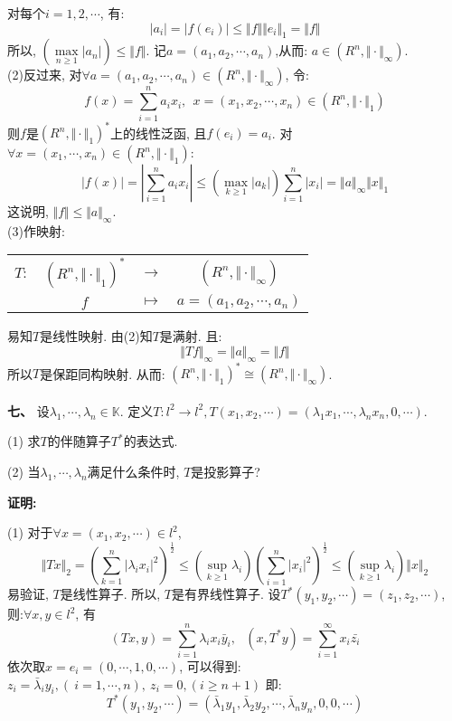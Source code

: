 \documentclass{article}
\begin{document}
对每个$i=1,2,\cdots$, 有:
$$ |a_i| = |f(e_i)| \leq \Vert f \Vert \Vert e_i \Vert_1 = \Vert f \Vert $$
所以, $(\max\limits_{n \geq 1} |a_n|) \leq \Vert f \Vert$. 记$a=(a_1, a_2, \cdots, a_n)$,从而: $a \in (R^n, \Vert \cdot \Vert_{\infty})$. \\

(2)反过来, 对$\forall a = (a_1, a_2, \cdots, a_n) \in (R^n, \Vert \cdot \Vert_{\infty})$, 令:
$$ f(x) = \sum\limits_{i=1}^n a_ix_i, \ \ x=(x_1, x_2, \cdots, x_n) \in (R^n, \Vert \cdot \Vert_1) $$
则$f$是$(R^n, \Vert \cdot \Vert_1)^*$上的线性泛函, 且$f(e_i) = a_i$. 对$\forall x = (x_1, \cdots, x_n) \in (R^n, \Vert \cdot \Vert_1)$:
$$ |f(x)| = |\sum\limits_{i=1}^n a_ix_i| \leq (\max\limits_{k \geq 1} |a_k|) \sum\limits_{i=1}^n |x_i| = \Vert a \Vert_{\infty} \Vert x \Vert_1 $$
这说明, $\Vert f \Vert \leq \Vert a \Vert_{\infty}$. \\

(3)作映射:
\begin{center}
\begin{tabular}{cccc}
 $T:$  &  $(R^n, \Vert \cdot \Vert_1)^*$ & $\rightarrow$ & $(R^n, \Vert \cdot \Vert_{\infty})$ \\
       &                 $f$            &  $\mapsto$   &  $a =(a_1, a_2, \cdots, a_n)$ \\
\end{tabular}
\end{center}
易知$T$是线性映射. 由(2)知$T$是满射. 且:
$$ \Vert Tf \Vert_{\infty} = \Vert a \Vert_{\infty} = \Vert f \Vert$$
所以$T$是保距同构映射. 从而: $(R^n, \Vert \cdot \Vert_1)^* \cong (R^n, \Vert \cdot \Vert_{\infty}) $.  \\  \\ 


\textbf{七、} 设$\lambda_1, \cdots, \lambda_n \in \mathbb{K}$. 定义$T: l^2 \rightarrow l^2, T(x_1, x_2, \cdots) = (\lambda_1x_1, \cdots, \lambda_nx_n, 0, \cdots)$. 

\hspace{2em} (1) 求$T$的伴随算子$T^*$的表达式. 

\hspace{2em} (2) 当$\lambda_1, \cdots, \lambda_n$满足什么条件时, $T$是投影算子?  

\textbf{证明:} 

(1) 对于$\forall x=(x_1, x_2, \cdots) \in l^2$, 
$$ \Vert Tx \Vert_2 = (\sum\limits_{k=1}^n |\lambda_i x_i|^2)^{\frac{1}{2}} \leq (\sup\limits_{k \geq 1} \lambda_i) (\sum\limits_{i=1}^n |x_i|^2)^{\frac{1}{2}} \leq  (\sup\limits_{k \geq 1} \lambda_i) \Vert x \Vert_2 $$
易验证, $T$是线性算子. 所以, $T$是有界线性算子. 设$T^*(y_1, y_2, \cdots) = (z_1, z_2, \cdots)$, 则:$\forall x, y \in l^2$, 有
$$ (Tx, y) = \sum\limits_{i=1}^n \lambda_ix_i\bar{y}_i, \ \ \ (x, T^*y ) = \sum\limits_{i=1}^{\infty} x_i \bar{z_i}$$
依次取$x=e_i=(0,\cdots, 1, 0, \cdots)$, 可以得到: $z_i = \bar{\lambda}_iy_i, (\ i=1,\cdots,n), \ z_i=0, (i \geq n+1)$ 即:
$$ T^*(y_1, y_2, \cdots) = (\bar{\lambda}_1y_1, \bar{\lambda}_2y_2, \cdots, \bar{\lambda}_ny_n, 0, 0, \cdots) $$ 
\end{document}
